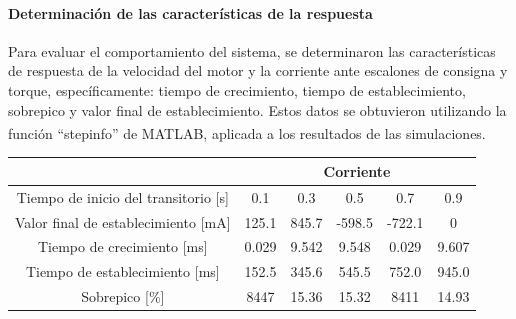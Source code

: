 \documentclass[a4paper, 10pt, onecolumn,journal]{ieeeconf}
\begin{document}
\paragraph{\textbf{Determinación de las características de la respuesta}}
Para evaluar el comportamiento del sistema, se determinaron las características de respuesta de la velocidad del motor y la corriente ante escalones de consigna y torque, específicamente: tiempo de crecimiento, tiempo de establecimiento, sobrepico y valor final de establecimiento. Estos datos se obtuvieron utilizando la función ``stepinfo'' de MATLAB\textsuperscript{\textregistered}, aplicada a los resultados de las simulaciones.
\begin{table}[H]
	\centering
	\begin{tabular}{|c|ccccc|}
		\hline
		& \multicolumn{5}{c|}{Corriente}                                                                                              \\ \hline
		Tiempo de inicio del transitorio {[}s{]} & \multicolumn{1}{c|}{0.1}   & \multicolumn{1}{c|}{0.3}   & \multicolumn{1}{c|}{0.5}    & \multicolumn{1}{c|}{0.7}    & 0.9   \\ \hline
		Valor final de establecimiento {[}mA{]}  & \multicolumn{1}{c|}{125.1} & \multicolumn{1}{c|}{845.7} & \multicolumn{1}{c|}{-598.5} & \multicolumn{1}{c|}{-722.1} & 0     \\ \hline
		Tiempo de crecimiento {[}ms{]}           & \multicolumn{1}{c|}{0.029} & \multicolumn{1}{c|}{9.542} & \multicolumn{1}{c|}{9.548}  & \multicolumn{1}{c|}{0.029}  & 9.607 \\ \hline
		Tiempo de establecimiento {[}ms{]}       & \multicolumn{1}{c|}{152.5} & \multicolumn{1}{c|}{345.6} & \multicolumn{1}{c|}{545.5}  & \multicolumn{1}{c|}{752.0}  & 945.0 \\ \hline
		Sobrepico {[}\%{]}                       & \multicolumn{1}{c|}{8447}  & \multicolumn{1}{c|}{15.36} & \multicolumn{1}{c|}{15.32}  & \multicolumn{1}{c|}{8411}   & 14.93 \\ \hline
	\end{tabular}
\end{table}
\end{document}
